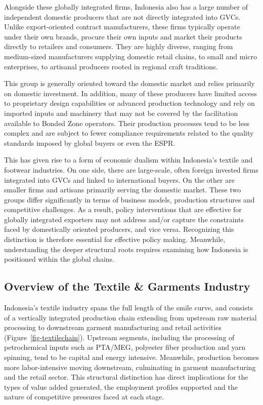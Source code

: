 \documentclass[
  manuscript=article,
  layout=publish,
  year=2026,
  volume=1,
]{den}
\begin{document}
Alongside these globally integrated firms, Indonesia also has a large
number of independent domestic producers that are not directly
integrated into GVCs. Unlike export-oriented contract manufacturers,
these firms typically operate under their own brands, procure their own
inputs and market their products directly to retailers and consumers.
They are highly diverse, ranging from medium-sized manufacturers
supplying domestic retail chains, to small and micro enterprises, to
artisanal producers rooted in regional craft traditions.

This group is generally oriented toward the domestic market and relies
primarily on domestic investment. In addition, many of these producers
have limited access to proprietary design capabilities or advanced
production technology and rely on imported inputs and machinery that may
not be covered by the facilitation available to Bonded Zone operators.
Their production processes tend to be less complex and are subject to
fewer compliance requirements related to the quality standards imposed
by global buyers or even the ESPR.

This has given rise to a form of economic dualism within Indonesia's
textile and footwear industries. On one side, there are large-scale,
often foreign invested firms integrated into GVCs and linked to
international buyers. On the other are smaller firms and artisans
primarily serving the domestic market. These two groups differ
significantly in terms of business models, production structures and
competitive challenges. As a result, policy interventions that are
effective for globally integrated exporters may not address and/or
capture the constraints faced by domestically oriented producers, and
vice versa. Recognizing this distinction is therefore essential for
effective policy making. Meanwhile, understanding the deeper structural
roots requires examining how Indonesia is positioned within the global
chains.

\subsection{Overview of the Textile \& Garments
Industry}\label{overview-of-the-textile-garments-industry}

Indonesia's textile industry spans the full length of the smile curve,
and consists of a vertically integrated production chain extending from
upstream raw material processing to downstream garment manufacturing and
retail activities (Figure~\ref{fig-textilechain}). Upstream segments,
including the processing of petrochemical inputs such as PTA/MEG,
polyester fiber production and yarn spinning, tend to be capital and
energy intensive. Meanwhile, production becomes more labor-intensive
moving downstream, culminating in garment manufacturing and the retail
sector. This structural distinction has direct implications for the
types of value added generated, the employment profiles supported and
the nature of competitive pressures faced at each stage.
\end{document}
